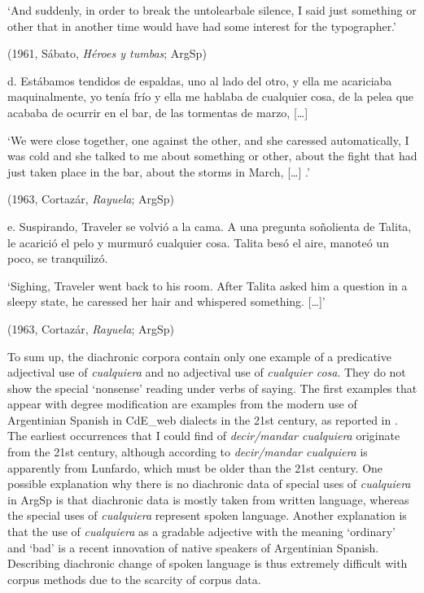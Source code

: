     ‘And suddenly, in order to break the untolearbale silence, I said just something or other that in another time would have had some interest for the typographer.’

    (1961, Sábato, \textit{Héroes y tumbas}; ArgSp)

  d.  Estábamos tendidos de espaldas, uno al lado del otro, y ella me acariciaba maquinalmente, yo tenía frío y ella me hablaba de cualquier cosa, de la pelea que acababa de ocurrir en el bar, de las tormentas de marzo, […]

    ‘We were close together, one against the other, and she caressed automatically, I was cold and she talked to me about something or other, about the fight that had just taken place in the bar, about the storms in March, […] .’

    (1963, Cortazár, \textit{Rayuela}; ArgSp)

  e.  Suspirando, Traveler se volvió a la cama. A una pregunta soñolienta de Talita, le acarició el pelo y murmuró cualquier cosa. Talita besó el aire, manoteó un poco, se tranquilizó.

    ‘Sighing, Traveler went back to his room. After Talita asked him a question in a sleepy state, he caressed her hair and whispered something. […]’

    (1963, Cortazár, \textit{Rayuela}; ArgSp)

To sum up, the diachronic corpora contain only one example of a predicative adjectival use of \textit{cualquiera} and no adjectival use of \textit{cualquier cosa}. They do not show the special ‘nonsense’ reading under verbs of saying. The first examples that appear with degree modification are examples from the modern use of Argentinian Spanish in CdE\_web dialects in the 21st century, as reported in . The earliest occurrences that I could find of \textit{decir/mandar cualquiera} originate from the 21st century, although according to \citet{Conde2011} \textit{decir/mandar cualquiera} is apparently from Lunfardo, which must be older than the 21st century. One possible explanation why there is no diachronic data of special uses of \textit{cualquiera} in ArgSp is that diachronic data is mostly taken from written language, whereas the special uses of \textit{cualquiera} represent spoken language. Another explanation is that the use of \textit{cualquiera} as a gradable adjective with the meaning ‘ordinary’ and ‘bad’ is a recent innovation of native speakers of Argentinian Spanish. Describing diachronic change of spoken language is thus extremely difficult with corpus methods due to the scarcity of corpus data.

